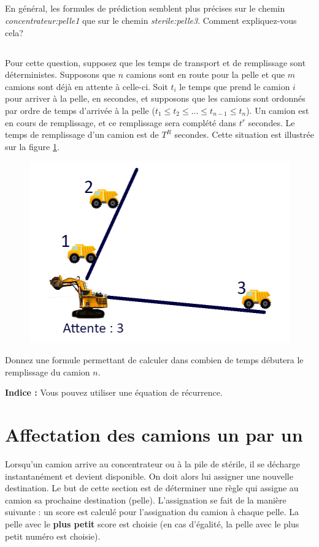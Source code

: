 \documentclass[letterpaper,12pt]{article}
\let\oldref\ref
\newcommand\myref[1]{\oldref{#1}}
\renewcommand{\ref}[1]{{\myref{#1}}}
\begin{document}
	\subsection{}
	En général, les formules de prédiction semblent plus précises sur le chemin \textit{concentrateur:pelle1} que sur le chemin \textit{sterile:pelle3}. Comment expliquez-vous cela?
	
	\subsection{}
	
	Pour cette question, supposez que les temps de transport et de remplissage sont déterministes. Supposons que $n$ camions sont en route pour la pelle et que $m$ camions sont déjà en attente à celle-ci. Soit $t_i$ le temps que prend le camion $i$ pour arriver à la pelle, en secondes, et supposons que les camions sont ordonnés par ordre de temps d'arrivée à la pelle ($t_1 \leq t_2 \leq ...\leq t_{n-1} \leq t_n$). Un camion est en cours de remplissage, et ce remplissage sera complété dans $t^r$ secondes. Le temps de remplissage d'un camion est de $T^R$ secondes. Cette situation est illustrée sur la figure \ref{fig:file}.
	
	\begin{figure}
		\center
		\includegraphics[width=0.4\linewidth]{File.png}
		\caption{\label{fig:file}}
	\end{figure}
	
	Donnez une formule permettant de calculer dans combien de temps débutera le remplissage du camion $n$.
	
	\textbf{Indice :} Vous pouvez utiliser une équation de récurrence.
	
	\section{Affectation des camions un par un}
	\label{sec:score}
	Lorsqu'un camion arrive au concentrateur ou à la pile de stérile, il se décharge instantanément et devient disponible. On doit alors lui assigner une nouvelle destination. Le but de cette section est de déterminer une règle qui assigne au camion sa prochaine destination (pelle). L'assignation se fait de la manière suivante : un score est calculé pour l'assignation du camion à chaque pelle. La pelle avec le \textbf{plus petit} score est choisie (en cas d'égalité, la pelle avec le plus petit numéro est choisie).
	
\end{document}
